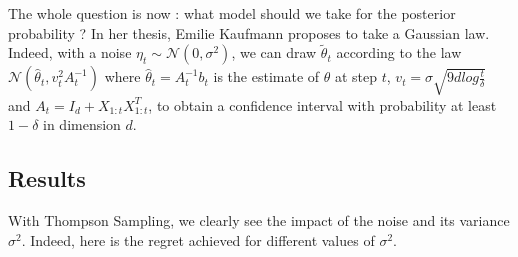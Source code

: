 \documentclass[11pt,a4paper]{article}
\begin{document}
The whole question is now : what model should we take for the posterior probability ? In her thesis, Emilie Kaufmann proposes to take a Gaussian law. Indeed, with a noise $\eta_t \sim \mathcal{N}(0,\sigma^2)$, we can draw $\widetilde{\theta}_{t}$ according to the law $\mathcal{N}(\widehat{\theta}_t,v_t^2 A_t^{-1})$ where $\widehat{\theta}_t = A_{t}^{-1}b_{t}$ is the estimate of $\theta$ at step $t$,  $v_t = \sigma \sqrt{9 d log \frac{t}{\delta}}$ and $A_t = I_d + X_{1:t}X_{1:t}^T$, to obtain a confidence interval with probability at least $1-\delta$ in dimension $d$.

\subsection{Results}

With Thompson Sampling, we clearly see the impact of the noise and its variance $\sigma^2$. Indeed, here is the regret achieved for different values of $\sigma^2$.
\end{document}
